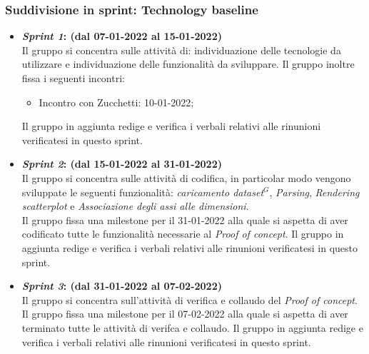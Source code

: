 \subsubsection{Suddivisione in sprint: Technology baseline}
\begin{itemize}
    \item \textbf{\textit{Sprint 1}: (dal 07-01-2022 al 15-01-2022)}\\
    Il gruppo si concentra sulle attività di: individuazione delle tecnologie da utilizzare e individuazione delle funzionalità da sviluppare.
    Il gruppo inoltre fissa i seguenti incontri:
    \begin{itemize}
        \item Incontro con Zucchetti: 10-01-2022;
    \end{itemize}
    Il gruppo in aggiunta redige e verifica i verbali relativi alle rinunioni verificatesi in questo sprint.

    \item \textbf{\textit{Sprint 2}: (dal 15-01-2022 al 31-01-2022)}\\
    Il gruppo si concentra sulle attività di codifica, in particolar modo vengono sviluppate le seguenti funzionalità: \textit{caricamento dataset$^{G}$}, \textit{Parsing}, \textit{Rendering scatterplot} e \textit{Associazione degli assi alle dimensioni}.\\
    Il gruppo fissa una milestone per il 31-01-2022 alla quale si aspetta di aver codificato tutte le funzionalità necessarie al \textit{Proof of concept}.
    Il gruppo in aggiunta redige e verifica i verbali relativi alle rinunioni verificatesi in questo sprint.

    \item \textbf{\textit{Sprint 3}: (dal 31-01-2022 al 07-02-2022)}\\
    Il gruppo si concentra sull'attività di verifica e collaudo del \textit{Proof of concept}.\\
    Il gruppo fissa una milestone per il 07-02-2022 alla quale si aspetta di aver terminato tutte le attività di verifca e collaudo.
    Il gruppo in aggiunta redige e verifica i verbali relativi alle rinunioni verificatesi in questo sprint.
\end{itemize}